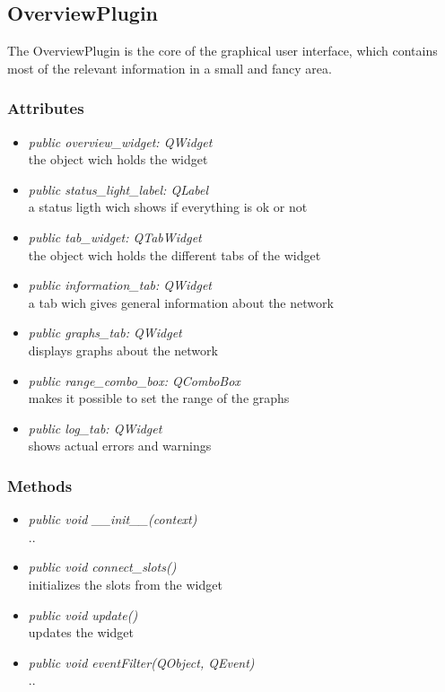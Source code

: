 \subsection{OverviewPlugin}
The OverviewPlugin is the core of the graphical user interface, which
contains most of the relevant information in a small and fancy area.
\subsubsection{Attributes}
\begin{itemize}
  \item \textit{public overview\_widget: QWidget}\\
  the object wich holds the widget
  \item \textit{public status\_light\_label: QLabel}\\
  a status ligth wich shows if everything is ok or not
  \item \textit{public tab\_widget: QTabWidget}\\
  the object wich holds the different tabs of the widget
  \item \textit{public information\_tab: QWidget}\\
  a tab wich gives general information about the network 
  \item \textit{public graphs\_tab: QWidget}\\
  displays graphs about the network
  \item \textit{public range\_combo\_box: QComboBox}\\
  makes it possible to set the range of the graphs
  \item \textit{public log\_tab: QWidget}\\
  shows actual errors and warnings 
\end{itemize}
\subsubsection{Methods}
\begin{itemize}
  \item \textit{public void \_\_init\_\_(context)}\\
  ..
  \item \textit{public void connect\_slots()}\\
  initializes the slots from the widget
  \item \textit{public void update()}\\
  updates the widget
  \item \textit{public void eventFilter(QObject, QEvent)}\\
  ..
\end{itemize}

